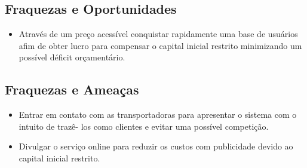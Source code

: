 \subsection{Fraquezas e Oportunidades}
\begin{itemize}
\item Através de um preço acessível conquistar rapidamente  uma base de usuários afim de obter lucro para compensar o capital inicial restrito minimizando um possível déficit orçamentário.
\end{itemize}
\subsection{Fraquezas e Ameaças}
\begin{itemize}
\item Entrar em contato com as transportadoras para apresentar o sistema com o intuito de trazê-
los como clientes e evitar uma possível competição.
\item Divulgar o serviço online para reduzir os custos com publicidade devido ao capital inicial restrito.
\end{itemize}
